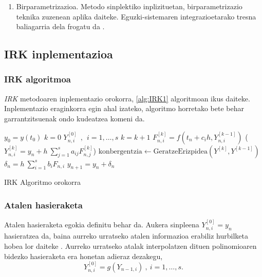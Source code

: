 \begin{enumerate}

\item{Birparametrizazioa.}
Metodo sinplektiko inplizituetan, birparametrizazio teknika zuzenean aplika daiteke. Eguzki-sistemaren integrazioetarako tresna baliagarria dela frogatu da \cite{Fukushima2007}. 
  
\end{enumerate}

      
\subsection{IRK inplementazioa}

\subsubsection*{IRK algoritmoa}

\emph{IRK} metodoaren inplementazio orokorra, \ref{alg:IRK1} algoritmoan ikus daiteke. Inplementazio eraginkorra egin ahal izateko, algoritmo horretako bete behar garrantzitsuenak ondo kudeatzea komeni da.

\begin{algorithm}[H]
 \BlankLine
  $y_0=y(t_0)$\;
 \BlankLine
  {
   \BlankLine
   $k=0$\;
     $Y_{n,i}^{[0]} \ \ , \ \ i=1,\dots,s $\;
    \BlankLine
   {
    \BlankLine
    $k=k+1$\; 
    $F_{n,i}^{[k]}=f(t_n+c_ih,Y_{n,i}^{[k-1]}) $\;
     ($Y_{n,i}^{[k]}=y_{n}+ h \ \sum\limits_{j=1}^{s} a_{ij} F_{n,j}^{[k]}$) \; 
    $\text{konbergentzia} \leftarrow \text{GeratzeErizpidea}(Y^{[k]},Y^{[k-1]}) $\; 
   }
   \BlankLine
    $\delta_n=h \ \sum\limits_{i=1}^{s} b_i F_{n,i}$\;
    $y_{n+1}=y_{n}+ \delta_n $\;
   \BlankLine
 }
 \caption{IRK Algoritmo orokorra}
 \label{alg:IRK1}
\end{algorithm}


\subsubsection*{Atalen hasieraketa}
\label{ss:2.2.3.2}

Atalen hasieraketa egokia definitu behar da. Aukera sinpleena $Y_{n,i}^{[0]}=y_{n}$ hasieratzea da, baina aurreko urratseko atalen informazioa erabiliz hurbilketa hobea lor daiteke \cite{Hairer2006}. Aurreko urratseko atalak interpolatzen dituen polinomioaren 
bidezko hasieraketa era honetan adieraz dezakegu,
\begin{equation*}
Y_{n,i}^{[0]}=g(Y_{n-1,i}) \ , \ i=1, \dots, s. 
\end{equation*}

